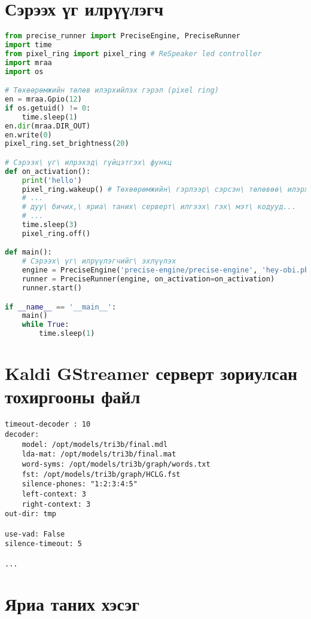 \appendix
{}

\chapter{Сэрээх үг илрүүлэгч}
\label{appendix:wake-word-listener}

\begin{lstlisting}[language=Python]
from precise_runner import PreciseEngine, PreciseRunner
import time
from pixel_ring import pixel_ring # ReSpeaker led controller
import mraa
import os

# Төхөөрөмжийн төлөв илэрхийлэх гэрэл (pixel ring)
en = mraa.Gpio(12)
if os.getuid() != 0:
    time.sleep(1)
en.dir(mraa.DIR_OUT)
en.write(0)
pixel_ring.set_brightness(20)

# Сэрээх\ үг\ илрэхэд\ гүйцэтгэх\ функц
def on_activation():
    print('hello')
    pixel_ring.wakeup() # Төхөөрөмжийн\ гэрлээр\ сэрсэн\ төлөвөө\ илэрхийлнэ
    # ...
    # дуу\ бичих,\ яриа\ таних\ серверт\ илгээх\ гэх\ мэт\ кодууд...
    # ...
    time.sleep(3)
    pixel_ring.off()

def main():
    # Сэрээх\ үг\ илрүүлэгчийг\ эхлүүлэх
    engine = PreciseEngine('precise-engine/precise-engine', 'hey-obi.pb') # hey-obi.pb\ нь\ сургасан\ модель
    runner = PreciseRunner(engine, on_activation=on_activation)
    runner.start()

if __name__ == '__main__':
    main()
    while True:
        time.sleep(1)
\end{lstlisting}

\chapter{Kaldi GStreamer серверт зориулсан тохиргооны файл}
\label{appendix:kaldi-gstreamer-yaml}

\begin{lstlisting}
timeout-decoder : 10
decoder:
    model: /opt/models/tri3b/final.mdl
    lda-mat: /opt/models/tri3b/final.mat
    word-syms: /opt/models/tri3b/graph/words.txt
    fst: /opt/models/tri3b/graph/HCLG.fst
    silence-phones: "1:2:3:4:5"
    left-context: 3
    right-context: 3
out-dir: tmp

use-vad: False
silence-timeout: 5

...
\end{lstlisting}

\chapter{Яриа таних хэсэг}
\label{appendix:stt}

